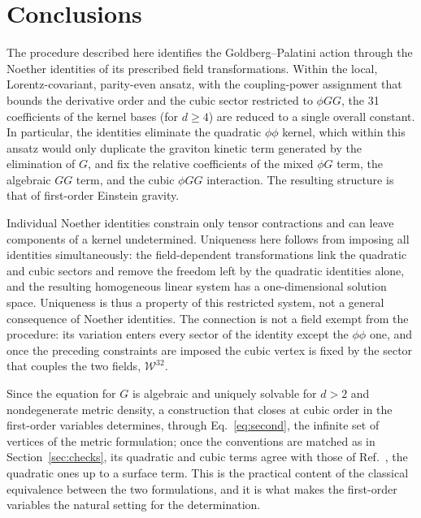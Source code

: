 \documentclass[prd,aps,preprint,nofootinbib,amsmath,amssymb,eqsecnum]{revtex4-2}
\newcommand{\W}{\mathcal{W}}
\begin{document}
\section{Conclusions}
\label{sec:conclusions}

The procedure described here identifies the Goldberg--Palatini action through the
Noether identities of its prescribed field transformations. Within the local,
Lorentz-covariant, parity-even ansatz, with the coupling-power assignment that bounds the
derivative order and the cubic sector restricted to $\phi GG$, the 31 coefficients of the kernel bases (for $d\geq4$) are
reduced to a single overall constant.
In particular, the identities eliminate the quadratic $\phi\phi$ kernel, which within this
ansatz would only duplicate the graviton kinetic term generated by the elimination of $G$,
and fix the relative
coefficients of the mixed $\phi G$ term, the algebraic $GG$ term, and the cubic $\phi GG$
interaction. The resulting structure is that of first-order Einstein gravity.

Individual Noether identities constrain only tensor contractions and can leave components of
a kernel undetermined. Uniqueness here follows from imposing all identities simultaneously:
the field-dependent transformations link the quadratic and cubic sectors and remove the
freedom left by the quadratic identities alone, and the resulting homogeneous linear system
has a one-dimensional solution space. Uniqueness is thus a property of this restricted
system, not a general consequence of Noether identities. The connection is not a field
exempt from the procedure: its variation enters every sector of the identity except the
$\phi\phi$ one, and once the preceding constraints are imposed the cubic vertex is fixed by
the sector that couples the two fields, $\W^{32}$.

Since the equation for $G$ is algebraic and uniquely solvable for $d>2$ and nondegenerate
metric density, a construction that closes at cubic order in the first-order variables
determines, through Eq.~\eqref{eq:second}, the infinite set of vertices of the metric
formulation; once the conventions are matched as in Section~\ref{sec:checks}, its quadratic
and cubic terms agree with those of Ref.~\cite{CLM1973}, the quadratic ones up to a surface
term. This is the practical content of the classical equivalence between the two
formulations, and it is what makes the first-order variables the natural setting for the
determination.
\end{document}
